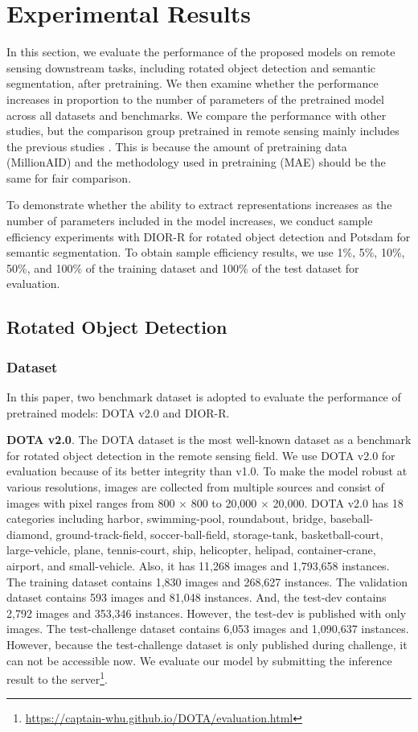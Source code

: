 \section{Experimental Results}

In this section, we evaluate the performance of the proposed models on remote sensing downstream tasks, including rotated object detection and semantic segmentation, after pretraining. We then examine whether the performance increases in proportion to the number of parameters of the pretrained model across all datasets and benchmarks. We compare the performance with other studies, but the comparison group pretrained in remote sensing mainly includes the previous studies \cite{wang2022advancing}. This is because the amount of pretraining data (MillionAID) and the methodology used in pretraining (MAE) should be the same for fair comparison.

To demonstrate whether the ability to extract representations increases as the number of parameters included in the model increases, we conduct sample efficiency experiments with DIOR-R for rotated object detection and Potsdam for semantic segmentation. To obtain sample efficiency results, we use 1\%, 5\%, 10\%, 50\%, and 100\% of the training dataset and 100\% of the test dataset for evaluation.

\subsection{Rotated Object Detection}

\subsubsection{Dataset}

In this paper, two benchmark dataset is adopted to evaluate the performance of pretrained models: DOTA v2.0\cite{ding2021object} and DIOR-R\cite{cheng2022anchor}.

\textbf{DOTA v2.0}. The DOTA dataset is the most well-known dataset as a benchmark for rotated object detection in the remote sensing field. We use DOTA v2.0 for evaluation because of its better integrity than v1.0. To make the model robust at various resolutions, images are collected from multiple sources and consist of images with pixel ranges from 800 $\times$ 800 to 20,000 $\times$ 20,000. DOTA v2.0 has 18 categories including harbor, swimming-pool, roundabout, bridge, baseball-diamond, ground-track-field, soccer-ball-field, storage-tank, basketball-court, large-vehicle, plane, tennis-court, ship, helicopter, helipad, container-crane, airport, and small-vehicle. Also, it has 11,268 images and 1,793,658 instances. The training dataset contains 1,830 images and 268,627 instances. The validation dataset contains 593 images and 81,048 instances. And, the test-dev contains 2,792 images and 353,346 instances. However, the test-dev is published with only images. The test-challenge dataset contains 6,053 images and 1,090,637 instances. However, because the test-challenge dataset is only published during challenge, it can not be accessible now. We evaluate our model by submitting the inference result to the server\footnote{\url{https://captain-whu.github.io/DOTA/evaluation.html}}.

